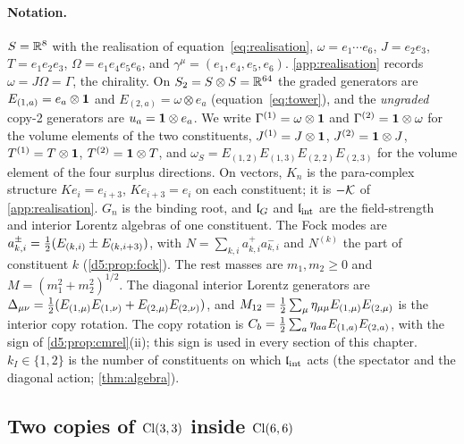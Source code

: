 \paragraph{Notation.} $S=\mathbb{R}^8$ with the realisation of equation~\cref{eq:realisation}, $\omega=e_1\cdots e_6$, $J=e_2e_3$, $T=e_1e_2e_3$,
$\Omega=e_1e_4e_5e_6$, and $\gamma^\mu=(e_1,e_4,e_5,e_6)$. \cref{app:realisation} records $\omega=J\Omega=\Gamma$, the chirality. On
$S_2=S\otimes S=\mathbb{R}^{64}$ the graded generators are $E_{(1,a)}=e_a\otimes\mathbf 1$ and $E_{(2,a)}=\omega\otimes e_a$ (equation~\cref{eq:tower}),
and the \emph{ungraded} copy-2 generators are $u_a=\mathbf 1\otimes e_a$. We write $\Gamma^{(1)}=\omega\otimes\mathbf 1$ and $\Gamma^{(2)}=\mathbf 1\otimes\omega$
for the volume elements of the two constituents, $J^{(1)}=J\otimes\mathbf 1$, $J^{(2)}=\mathbf 1\otimes J$, $T^{(1)}=T\otimes\mathbf 1$, $T^{(2)}=\mathbf 1\otimes T$,
and $\omega_S=E_{(1,2)}E_{(1,3)}E_{(2,2)}E_{(2,3)}$ for the volume element of the four surplus directions. On vectors, $K_n$ is the
para-complex structure $Ke_i=e_{i+3}$, $Ke_{i+3}=e_i$ on each constituent; it is $-\mathcal K$ of \cref{app:realisation}. $G_n$ is the binding
root, and $\mathfrak l_G$ and $\mathfrak l_{\rm int}$ are the field-strength and interior Lorentz algebras of one constituent. The Fock modes are
$a^\pm_{k,i}=\tfrac12(E_{(k,i)}\pm E_{(k,i+3)})$, with $N=\sum_{k,i}a^+_{k,i}a^-_{k,i}$ and $N^{(k)}$ the part of constituent $k$
(\cref{d5:prop:fock}). The rest masses are $m_1,m_2\ge0$ and $M=(m_1^2+m_2^2)^{1/2}$. The diagonal interior Lorentz generators are
$\Delta_{\mu\nu}=\tfrac12(E_{(1,\mu)}E_{(1,\nu)}+E_{(2,\mu)}E_{(2,\nu)})$, and $M_{12}=\tfrac12\sum_\mu\eta_{\mu\mu}E_{(1,\mu)}E_{(2,\mu)}$ is the interior copy rotation.
The copy rotation is $C_b=\tfrac12\sum_a\eta_{aa}E_{(1,a)}E_{(2,a)}$, with the sign of \cref{d5:prop:cmrel}(ii); this sign is used in every
section of this chapter. $k_I\in\{1,2\}$ is the number of constituents on which $\mathfrak l_{\rm int}$ acts (the spectator and the diagonal action;
\cref{thm:algebra}).

\subsection{Two copies of \texorpdfstring{$\mathrm{Cl}(3,3)$}{Cl(3,3)} inside \texorpdfstring{$\mathrm{Cl}(6,6)$}{Cl(6,6)}}
\label{e1:sec:copies}


